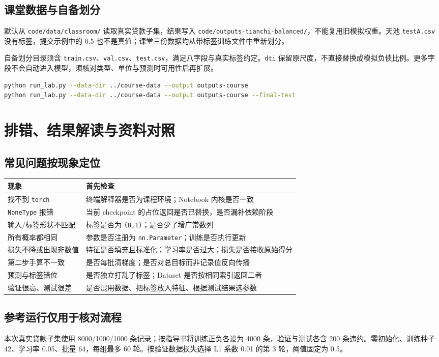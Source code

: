 \documentclass[UTF8,a4paper,11pt,fontset=fandol]{ctexart}
\newcommand{\file}[1]{\nolinkurl{#1}}
\begin{document}
\subsection{课堂数据与自备划分}
默认从 \file{code/data/classroom/} 读取真实贷款子集，结果写入 \file{code/outputs-tianchi-balanced/}，不能复用旧模拟权重。天池 \file{testA.csv} 没有标签，提交示例中的 0.5 也不是真值；课堂三份数据均从带标签训练文件中重新划分。

自备划分目录须含 \file{train.csv}、\file{val.csv}、\file{test.csv}，满足八字段与真实标签约定。\file{dti} 保留原尺度，不直接替换成模拟负债比例。更多字段不会自动进入模型，须核对类型、单位与预测时可用性后再扩展。
\begin{lstlisting}[language=bash]
python run_lab.py --data-dir ../course-data --output outputs-course
python run_lab.py --data-dir ../course-data --output outputs-course --final-test
\end{lstlisting}
\clearpage
\section{排错、结果解读与资料对照}
\subsection{常见问题按现象定位}
\par\noindent\begin{tabularx}{\linewidth}{L{3.5cm}Y}\toprule
现象 & 首先检查\\\midrule
找不到 \texttt{torch} & 终端解释器是否为课程环境；Notebook 内核是否一致\\
\texttt{NoneType} 报错 & 当前 checkpoint 的占位返回是否已替换，是否漏补依赖阶段\\
输入/标签形状不匹配 & 标签是否为 \texttt{(B,1)}；是否少了增广常数列\\
所有概率都相同 & 参数是否注册为 \texttt{nn.Parameter}；训练是否执行更新\\
损失不降或出现非数值 & 特征是否填充且标准化；学习率是否过大；损失是否接收原始得分\\
第二步手算不一致 & 是否每批清梯度；是否对总目标而非记录值反向传播\\
预测与标签错位 & 是否独立打乱了标签；Dataset 是否按相同索引返回二者\\
验证很高、测试很差 & 是否混用数据、把标签放入特征、根据测试结果选参数\\\bottomrule
\end{tabularx}
\subsection{参考运行仅用于核对流程}
本次真实贷款子集使用 8000/1000/1000 条记录；按指导书将训练正负各设为 4000 条，验证与测试各含 200 条违约。零初始化、训练种子 42、学习率 0.05、批量 64，每组最多 60 轮。按验证数据损失选择 L1 系数 0.01 的第 3 轮，阈值固定为 0.5。
\end{document}
